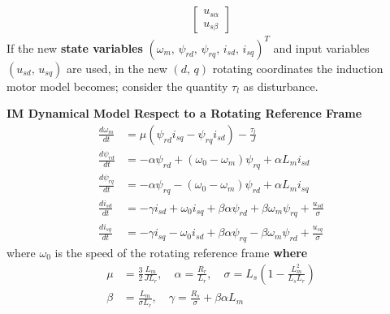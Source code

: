 \documentclass[11pt,a4paper]{scrartcl}
\numberwithin{equation}{section}
\theoremstyle{it}
\theoremstyle{definition}
\begin{document}
\begin{onehalfspace}
\begin{equation}
\begin{aligned}
		\left[
		\begin{matrix}
			u_{s\alpha} \\[6pt]
			u_{s\beta}
		\end{matrix}
		\right]
	\end{aligned}
\end{equation}
If the new \textbf{state variables} 
$(\omega_m,\,\psi_{rd},\,\psi_{rq},\,i_{sd},\,i_{sq})^T$ and input variables 
$(u_{sd},\,u_{sq})$ are used, in the new $(d,\,q)$ rotating coordinates the 
induction motor model becomes; consider the quantity $\tau_l$ as disturbance.
\begin{mybox}
	\textbf{IM Dynamical Model Respect to a Rotating Reference Frame}
	\begin{equation}\label{im_eq_41}
		\begin{aligned}
			\frac{d\omega_m}{dt} &= \mu \left(\psi_{rd}i_{sq} - 
			\psi_{rq}i_{sd}\right)-\frac{\tau_l}{J} \\[6pt]
			\frac{d\psi_{rd}}{dt} &= -\alpha \psi_{rd} 
			+\left(\omega_0-\omega_m\right) \psi_{rq}+ \alpha L_m i_{sd} \\[6pt]
			\frac{d\psi_{rq}}{dt} &= -\alpha 
			\psi_{rq}-\left(\omega_0-\omega_m\right) \psi_{rd}+\alpha L_m 
			i_{sq} \\[6pt]
			\frac{di_{sd}}{dt} &= -\gamma i_{sd}  + \omega_0 i_{sq} + 
			\beta\alpha\psi_{rd}+\beta\omega_m\psi_{rq} + \frac{u_{sd}}{\sigma} 
			\\[6pt]
			\frac{di_{sq}}{dt} &= -\gamma i_{sq}  - \omega_0 i_{sd} + 
			\beta\alpha\psi_{rq}-\beta\omega_m\psi_{rd} + \frac{u_{sq}}{\sigma}
		\end{aligned}
	\end{equation}
	where $\omega_0$ is the speed of the rotating reference frame
	\textbf{where}
	\begin{equation}\label{im_eq_42}
		\begin{aligned}
			\mu & = \frac{3}{2}\frac{L_m}{JL_r}, \quad
			\alpha = \frac{R_r}{L_r},  \quad
			\sigma = L_s \left(1-\frac{L_m^2}{L_sL_r}\right) \\[6pt]
			\beta & = \frac{L_m}{\sigma L_r},  \quad
			\gamma = \frac{R_s}{\sigma} + \beta \alpha L_m
		\end{aligned}
	\end{equation}
\end{mybox}


\end{onehalfspace}
\end{document}
